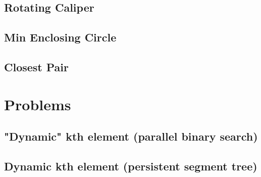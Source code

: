 \documentclass[a4paper,10pt,twocolumn,oneside]{article}
\begin{document}
\subsection{Rotating Caliper}

\subsection{Min Enclosing Circle}

\subsection{Closest Pair}

\section{Problems}
\subsection{"Dynamic" kth element (parallel binary search)}

\subsection{Dynamic kth element (persistent segment tree)}

\end{document}
